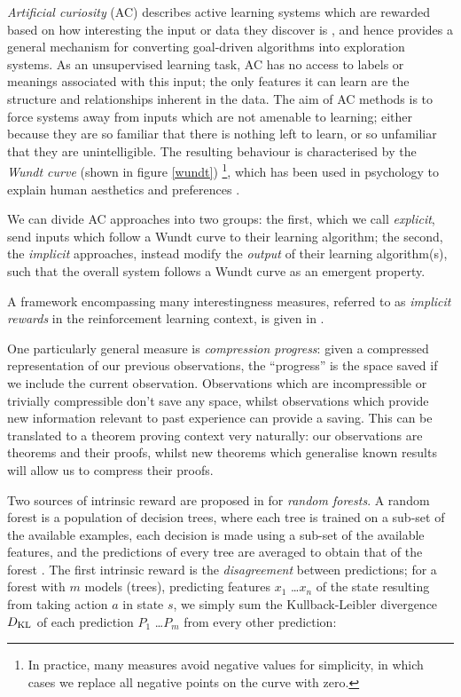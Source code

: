 \documentclass[]{article}
\begin{document}
\emph{Artificial curiosity} (AC) describes active learning systems which are rewarded based on how interesting the input or data they discover is \cite{schmidhuber2006developmental}, and hence provides a general mechanism for converting goal-driven algorithms into exploration systems. As an unsupervised learning task, AC has no access to labels or meanings associated with this input; the only features it can learn are the structure and relationships inherent in the data. The aim of AC methods is to force systems away from inputs which are not amenable to learning; either because they are so familiar that there is nothing left to learn, or so unfamiliar that they are unintelligible. The resulting behaviour is characterised by the \emph{Wundt curve} (shown in figure \ref{wundt}) \footnote{In practice, many measures avoid negative values for simplicity, in which cases we replace all negative points on the curve with zero.}, which has been used in psychology to explain human aesthetics and preferences \cite{berlyne1970novelty}.

We can divide AC approaches into two groups: the first, which we call \emph{explicit}, send inputs which follow a Wundt curve to their learning algorithm; the second, the \emph{implicit} approaches, instead modify the \emph{output} of their learning algorithm(s), such that the overall system follows a Wundt curve as an emergent property.

A framework encompassing many interestingness measures, referred to as \emph{implicit rewards} in the reinforcement learning context, is given in \cite{oudeyer2007intrinsic}.

One particularly general measure is \emph{compression progress}: given a compressed representation of our previous observations, the ``progress'' is the space saved if we include the current observation. Observations which are incompressible or trivially compressible don't save any space, whilst observations which provide new information relevant to past experience can provide a saving. This can be translated to a theorem proving context very naturally: our observations are theorems and their proofs, whilst new theorems which generalise known results will allow us to compress their proofs.

\cite{Schmidhuber1999}

Two sources of intrinsic reward are proposed in \cite{Hester.Stone:2012} for \emph{random forests}. A random forest is a population of decision trees, where each tree is trained on a sub-set of the available examples, each decision is made using a sub-set of the available features, and the predictions of every tree are averaged to obtain that of the forest \cite{randomforests}. The first intrinsic reward is the \emph{disagreement} between predictions; for a forest with $m$ models (trees), predicting features $x_1$ \dots $x_n$ of the state resulting from taking action $a$ in state $s$, we simply sum the Kullback-Leibler divergence $D_{\rm KL}$ of each prediction $P_1$ \dots $P_m$ from every other prediction:
\end{document}
